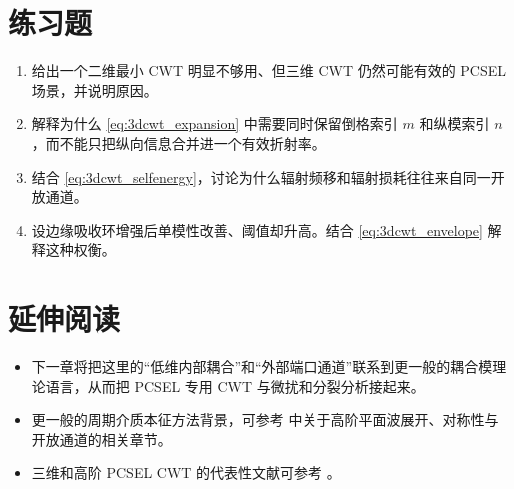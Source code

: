 \section*{练习题}
\begin{enumerate}
  \item \basicq 给出一个二维最小 CWT 明显不够用、但三维 CWT 仍然可能有效的 PCSEL 场景，并说明原因。

  \item \basicq 解释为什么 \cref{eq:3dcwt_expansion} 中需要同时保留倒格索引 $m$ 和纵模索引 $n$，而不能只把纵向信息合并进一个有效折射率。

  \item \midq 结合 \cref{eq:3dcwt_selfenergy}，讨论为什么辐射频移和辐射损耗往往来自同一开放通道。

  \item \hardq 设边缘吸收环增强后单模性改善、阈值却升高。结合 \cref{eq:3dcwt_envelope} 解释这种权衡。
\end{enumerate}

\section*{延伸阅读}
\begin{itemize}
  \item 下一章将把这里的“低维内部耦合”和“外部端口通道”联系到更一般的耦合模理论语言，从而把 PCSEL 专用 CWT 与微扰和分裂分析接起来。

  \item 更一般的周期介质本征方法背景，可参考 \cite{joannopoulos2008,sakoda2005} 中关于高阶平面波展开、对称性与开放通道的相关章节。

  \item 三维和高阶 PCSEL CWT 的代表性文献可参考 \cite{liang2012square,liang2013triangular,yang2014tm}。
\end{itemize}
